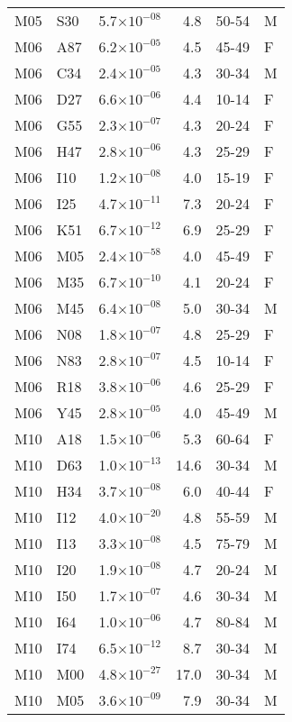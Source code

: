 \begin{longtable}{lllrll}
   M05 & S30 & 5.7$\times10^{-08}$ & 4.8 & 50-54 & M \\ 
   M06 & A87 & 6.2$\times10^{-05}$ & 4.5 & 45-49 & F \\ 
   M06 & C34 & 2.4$\times10^{-05}$ & 4.3 & 30-34 & M \\ 
   M06 & D27 & 6.6$\times10^{-06}$ & 4.4 & 10-14 & F \\ 
   M06 & G55 & 2.3$\times10^{-07}$ & 4.3 & 20-24 & F \\ 
   M06 & H47 & 2.8$\times10^{-06}$ & 4.3 & 25-29 & F \\ 
   M06 & I10 & 1.2$\times10^{-08}$ & 4.0 & 15-19 & F \\ 
   M06 & I25 & 4.7$\times10^{-11}$ & 7.3 & 20-24 & F \\ 
   M06 & K51 & 6.7$\times10^{-12}$ & 6.9 & 25-29 & F \\ 
   M06 & M05 & 2.4$\times10^{-58}$ & 4.0 & 45-49 & F \\ 
   M06 & M35 & 6.7$\times10^{-10}$ & 4.1 & 20-24 & F \\ 
   M06 & M45 & 6.4$\times10^{-08}$ & 5.0 & 30-34 & M \\ 
   M06 & N08 & 1.8$\times10^{-07}$ & 4.8 & 25-29 & F \\ 
   M06 & N83 & 2.8$\times10^{-07}$ & 4.5 & 10-14 & F \\ 
   M06 & R18 & 3.8$\times10^{-06}$ & 4.6 & 25-29 & F \\ 
   M06 & Y45 & 2.8$\times10^{-05}$ & 4.0 & 45-49 & M \\ 
   M10 & A18 & 1.5$\times10^{-06}$ & 5.3 & 60-64 & F \\ 
   M10 & D63 & 1.0$\times10^{-13}$ & 14.6 & 30-34 & M \\ 
   M10 & H34 & 3.7$\times10^{-08}$ & 6.0 & 40-44 & F \\ 
   M10 & I12 & 4.0$\times10^{-20}$ & 4.8 & 55-59 & M \\ 
   M10 & I13 & 3.3$\times10^{-08}$ & 4.5 & 75-79 & M \\ 
   M10 & I20 & 1.9$\times10^{-08}$ & 4.7 & 20-24 & M \\ 
   M10 & I50 & 1.7$\times10^{-07}$ & 4.6 & 30-34 & M \\ 
   M10 & I64 & 1.0$\times10^{-06}$ & 4.7 & 80-84 & M \\ 
   M10 & I74 & 6.5$\times10^{-12}$ & 8.7 & 30-34 & M \\ 
   M10 & M00 & 4.8$\times10^{-27}$ & 17.0 & 30-34 & M \\ 
   M10 & M05 & 3.6$\times10^{-09}$ & 7.9 & 30-34 & M \\ 

\end{longtable}
